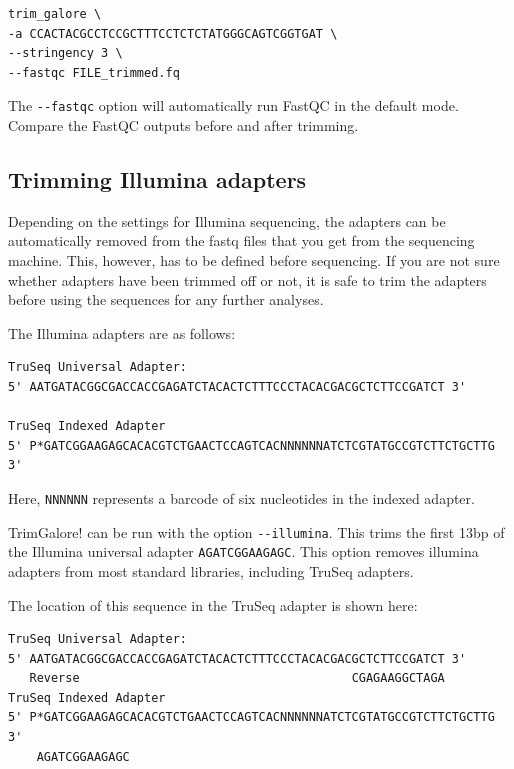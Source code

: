 \documentclass[11pt]{article}
\begin{document}
\begin{verbatim}
trim_galore \
-a CCACTACGCCTCCGCTTTCCTCTCTATGGGCAGTCGGTGAT \
--stringency 3 \
--fastqc FILE_trimmed.fq
\end{verbatim}

The \texttt{-{}-fastqc} option will automatically run FastQC in the default
mode. Compare the FastQC outputs before and after trimming.


\clearpage

\subsection{Trimming Illumina adapters}
\label{sec-3-2}
Depending on the settings for Illumina sequencing, the adapters can be
automatically removed from the fastq files that you get from the
sequencing machine. This, however, has to be defined before
sequencing. If you are not sure whether adapters have been trimmed off
or not, it is safe to trim the adapters before using the sequences for
any further analyses.

The Illumina adapters are as follows:

\begin{verbatim}
TruSeq Universal Adapter:
5' AATGATACGGCGACCACCGAGATCTACACTCTTTCCCTACACGACGCTCTTCCGATCT 3'

TruSeq Indexed Adapter
5' P*GATCGGAAGAGCACACGTCTGAACTCCAGTCACNNNNNNATCTCGTATGCCGTCTTCTGCTTG 3'
\end{verbatim}

Here, \texttt{NNNNNN} represents a barcode of six nucleotides in the indexed adapter.

TrimGalore! can be run with the option \texttt{-{}-illumina}. This trims the
first 13bp of the Illumina universal adapter \texttt{AGATCGGAAGAGC}. This
option removes illumina adapters from most standard libraries,
including TruSeq adapters.

The location of this sequence in the TruSeq adapter is shown here:

\begin{verbatim}
TruSeq Universal Adapter:
5' AATGATACGGCGACCACCGAGATCTACACTCTTTCCCTACACGACGCTCTTCCGATCT 3'
   Reverse                                      CGAGAAGGCTAGA 
TruSeq Indexed Adapter
5' P*GATCGGAAGAGCACACGTCTGAACTCCAGTCACNNNNNNATCTCGTATGCCGTCTTCTGCTTG 3'
    AGATCGGAAGAGC
\end{verbatim}
\end{document}
